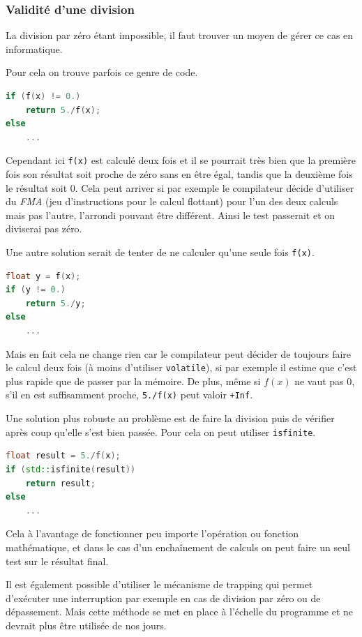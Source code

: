 \documentclass[a4paper]{report}
\begin{document}
\subsubsection{Validité d'une division}
La division par zéro étant impossible, il faut trouver un moyen de gérer ce cas en informatique.

Pour cela on trouve parfois ce genre de code.
\begin{lstlisting}[language=c++]
if (f(x) != 0.)
    return 5./f(x);
else
    ...
\end{lstlisting}
Cependant ici \verb'f(x)' est calculé deux fois et il se pourrait très bien que la première fois son résultat soit proche de zéro sans en être égal, tandis que la deuxième fois le résultat soit $0$.
Cela peut arriver si par exemple le compilateur décide d'utiliser du \emph{FMA} (jeu d'instructions pour le calcul flottant) pour l'un des deux calculs mais pas l'autre, l'arrondi pouvant être différent.
Ainsi le test passerait et on diviserai pas zéro.

Une autre solution serait de tenter de ne calculer qu'une seule fois \verb'f(x)'.
\begin{lstlisting}[language=c++]
float y = f(x);
if (y != 0.)
    return 5./y;
else
    ...
\end{lstlisting}
Mais en fait cela ne change rien car le compilateur peut décider de toujours faire le calcul deux fois (à moins d'utiliser \verb'volatile'), si par exemple il estime que c'est plus rapide que de passer par la mémoire.
De plus, même si $f(x)$ ne vaut pas $0$, s'il en est suffisamment proche, \verb'5./f(x)' peut valoir \verb'+Inf'.

Une solution plus robuste au problème est de faire la division puis de vérifier après coup qu'elle s'est bien passée.
Pour cela on peut utiliser \verb'isfinite'.
\begin{lstlisting}[language=c++]
float result = 5./f(x);
if (std::isfinite(result))
    return result;
else
    ...
\end{lstlisting}
Cela à l'avantage de fonctionner peu importe l'opération ou fonction mathématique, et dans le cas d'un enchaînement de calculs on peut faire un seul test sur le résultat final.

Il est également possible d'utiliser le mécanisme de trapping qui permet d'exécuter une interruption par exemple en cas de division par zéro ou de dépassement.
Mais cette méthode se met en place à l'échelle du programme et ne devrait plus être utilisée de nos jours.
\end{document}
